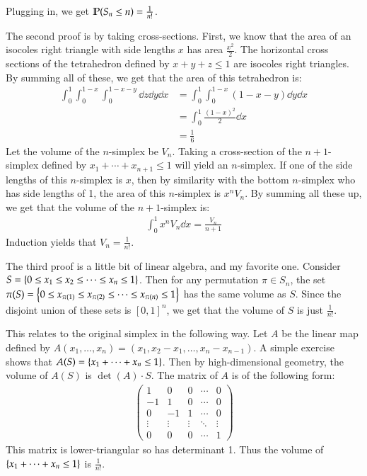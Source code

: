 \documentclass[12pt]{article}
\theoremstyle{definitionstyle}
\newcommand{\SET}[1]{\Set{\mskip-\medmuskip #1 \mskip-\medmuskip}}
\newcommand{\1}{\mathds 1}
\renewcommand{\P}{\mathbb P \qty}
\begin{document}
\begin{enumerate}
        Plugging in, we get $\P(S_n \leq n) = \frac{1}{n!}$. 

        The second proof is by taking cross-sections. First, we know that the area of an isocoles right triangle with side lengths $x$ has area $\frac{x^2}{2}$. The horizontal cross sections of the tetrahedron defined by $x+y+z \leq 1$ are isocoles right triangles. By summing all of these, we get that the area of this tetrahedron is:
        \begin{align*}
            \int_0^1 \int_0^{1-x} \int_0^{1-x-y} \dd z \dd y \dd x &= \int_0^1 \int_0^{1-x} (1-x-y) \dd y \dd x \\
            &= \int_0^1 \frac{(1-x)^2}{2} \dd x \\
            &= \frac{1}{6}
        \end{align*}
        Let the volume of the $n$-simplex be $V_n$. Taking a cross-section of the $n+1$-simplex defined by $x_1 + \cdots + x_{n+1} \leq 1$ will yield an $n$-simplex. If one of the side lengths of this $n$-simplex is $x$, then by similarity with the bottom $n$-simplex who has side lengths of 1, the area of this $n$-simplex is $x^nV_n$. By summing all these up, we get that the volume of the $n+1$-simplex is:
        \begin{align*}
            \int_0^1 x^n V_n \dd x = \frac{V_n}{n+1}
        \end{align*}
        Induction yields that $V_n = \frac{1}{n!}$.

        The third proof is a little bit of linear algebra, and my favorite one. Consider $S = \SET{0 \leq x_1 \leq x_2 \leq \cdots \leq x_n \leq 1}$. Then for any permutation $\pi \in S_n$, the set $\pi(S) = \SET{0 \leq x_{\pi(1)} \leq x_{\pi(2)} \leq \cdots \leq x_{\pi(n)} \leq 1}$ has the same volume as $S$. Since the disjoint union of these sets is $[0,1]^n$, we get that the volume of $S$ is just $\frac{1}{n!}$. 

        This relates to the original simplex in the following way. Let $A$ be the linear map defined by $A(x_1, \ldots, x_n) = (x_1, x_2 - x_1, \ldots, x_n - x_{n-1})$. A simple exercise shows that $A(S) = \SET{x_1 + \cdots + x_n \leq 1}$. Then by high-dimensional geometry, the volume of $A(S)$ is $\det(A) \cdot S$. The matrix of $A$ is of the following form:
        \begin{align*}
            \begin{pmatrix}
                1 & 0 & 0 & \cdots & 0 \\
                -1 & 1 & 0 & \cdots & 0 \\
                0 & -1 & 1 & \cdots & 0 \\
                \vdots & \vdots & \vdots & \ddots & \vdots \\
                0 & 0 & 0 & \cdots & 1
            \end{pmatrix}
        \end{align*}
        This matrix is lower-triangular so has determinant 1. Thus the volume of $\SET{x_1 + \cdots + x_n \leq 1}$ is $\frac{1}{n!}$.


\end{enumerate}
\end{document}

